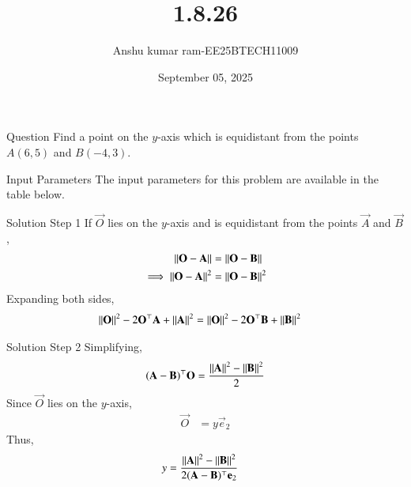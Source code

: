 \documentclass{beamer}
\title %
{1.8.26}
\date{September 05, 2025}
\author %
{Anshu kumar ram-EE25BTECH11009}
\begin{document}
\frame{\titlepage}

\begin{frame}{Question}
Find a point on the $y$-axis which is equidistant from the points $A(6,5)$ and $B(-4,3)$.
\end{frame}

\begin{frame}{Input Parameters}
The input parameters for this problem are available in the table below.

\end{frame}


\begin{frame}{Solution Step 1}
If $\vec{O}$ lies on the $y$-axis and is equidistant from the points $\vec{A}$ and $\vec{B}$,  
\begin{align}
\left\lVert\mathbf{O}-\mathbf{A}\right\rVert &= \left\lVert\mathbf{O}-\mathbf{B}\right\rVert \\
\implies \left\lVert\mathbf{O}-\mathbf{A}\right\rVert^2 &= \left\lVert\mathbf{O}-\mathbf{B}\right\rVert^2
\end{align}
Expanding both sides,  
\begin{align}
\left\lVert\mathbf{O}\right\rVert^2 - 2\mathbf{O}^\top \mathbf{A} + \left\lVert\mathbf{A}\right\rVert^2
&= \left\lVert\mathbf{O}\right\rVert^2 - 2\mathbf{O}^\top \mathbf{B} + \left\lVert\mathbf{B}\right\rVert^2
\end{align}
\end{frame}

\begin{frame}{Solution Step 2}
Simplifying,  
\begin{align}
(\mathbf{A}-\mathbf{B})^\top \mathbf{O}
= \frac{\left\lVert\mathbf{A}\right\rVert^2 - \left\lVert\mathbf{B}\right\rVert^2}{2}
\end{align}
Since $\vec{O}$ lies on the $y$-axis,  
\begin{align}
\vec{O} &= y \vec{e}_2
\end{align}
Thus,  
\begin{align}
y &= \frac{\left\lVert\mathbf{A}\right\rVert^2 - \left\lVert\mathbf{B}\right\rVert^2}{2(\mathbf{A}-\mathbf{B})^\top \mathbf{e}_2}
\end{align}
\end{frame}
\end{document}
